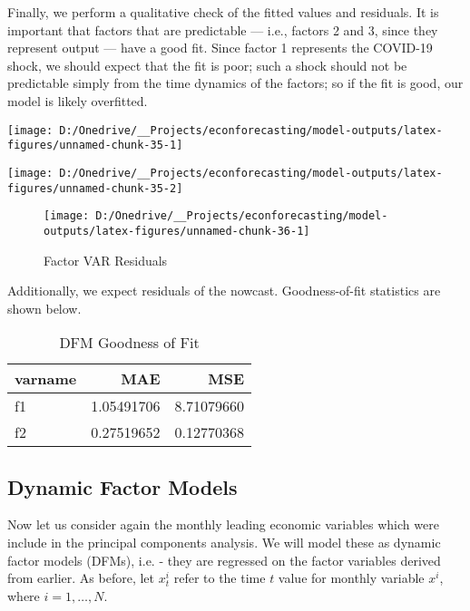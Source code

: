 \documentclass[11pt, letterpaper]{article}\usepackage[]{graphicx}\usepackage[]{color}
\begin{document}
Finally, we perform a qualitative check of the fitted values and residuals. It is important that factors that are predictable --- i.e., factors 2 and 3, since they represent output --- have a good fit. Since factor 1 represents the COVID-19 shock, we should expect that the fit is poor; such a shock should not be predictable simply from the time dynamics of the factors; so if the fit is good, our model is likely overfitted.


{\centering \texttt{[image: D:/Onedrive/\_\_Projects/econforecasting/model-outputs/latex-figures/unnamed-chunk-35-1]} 

}




{\centering \texttt{[image: D:/Onedrive/\_\_Projects/econforecasting/model-outputs/latex-figures/unnamed-chunk-35-2]} 

}





\begin{figure}[H]

{\centering \texttt{[image: D:/Onedrive/\_\_Projects/econforecasting/model-outputs/latex-figures/unnamed-chunk-36-1]} 

}

\caption[Factor VAR Residuals]{Factor VAR Residuals}\label{fig:unnamed-chunk-36}
\end{figure}



Additionally, we expect residuals of the nowcast. Goodness-of-fit statistics are shown below.
\begin{table}[H]
\centering
\begingroup\footnotesize
\begin{tabular}{lrr}
  \hline
varname & MAE & MSE \\ 
  \hline
f1 & 1.05491706 & 8.71079660 \\ 
  f2 & 0.27519652 & 0.12770368 \\ 
   \hline
\end{tabular}
\endgroup
\caption{DFM Goodness of Fit} 
\end{table}




\subsection{Dynamic Factor Models}
Now let us consider again the monthly leading economic variables which were include in the principal components analysis. We will model these as dynamic factor models (DFMs), i.e. - they are regressed on the factor variables derived from earlier. As before, let $x^i_t$ refer to the time $t$ value for monthly variable $x^i$, where $i = 1, \dots, N$.
\end{document}
